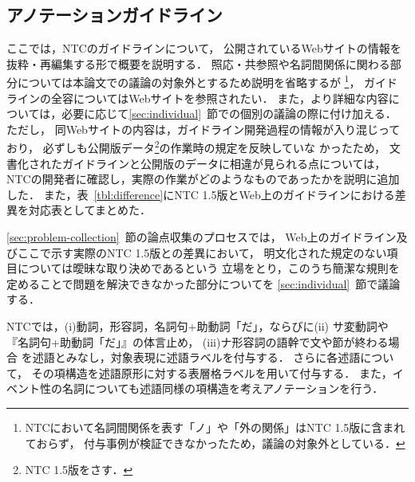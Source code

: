 \documentclass[japanese]{jnlp_1.4}
\begin{document}
\subsection{アノテーションガイドライン}
\label{sec:ntc-guideline}

ここでは，NTCのガイドラインについて，
公開されているWebサイト\cite{ntcguideline}の情報を抜粋・再編集する形で概要を説明する．
照応・共参照や名詞間関係に関わる部分については本論文での議論の対象外とするため説明を省略するが
\footnote{
NTCにおいて名詞間関係を表す「ノ」や「外の関係」はNTC 1.5版に含まれておらず，
付与事例が検証できなかったため，議論の対象外としている．}，
ガイドラインの全容についてはWebサイトを参照されたい．
また，より詳細な内容については，必要に応じて\ref{sec:individual}~節での個別の議論の際に付け加える．
ただし，
同Webサイトの内容は，ガイドライン開発過程の情報が入り混じっており，
必ずしも公開版データ\footnote{NTC 1.5版をさす．}の作業時の規定を反映していな
かったため，
文書化されたガイドラインと公開版のデータに相違が見られる点については，
NTCの開発者に確認し，実際の作業がどのようなものであったかを説明に追加した．
また，表~\ref{tbl:difference}にNTC 1.5版とWeb上のガイドラインにおける差異を対応表としてまとめた．

\begin{table}[b]
\caption{NTC 1.5版とWeb上のガイドラインにおける仕様の差異（共参照・照応・名詞間関係を除く）}
\label{tbl:difference}

\end{table}

\ref{sec:problem-collection}~節の論点収集のプロセスでは，
Web上のガイドライン及びここで示す実際のNTC 1.5版との差異において，
明文化された規定のない項目については曖昧な取り決めであるという
立場をとり，このうち簡潔な規則を定めることで問題を解決できなかった部分についてを
\ref{sec:individual}~節で議論する．

NTCでは，(i)動詞，形容詞，名詞句+助動詞「だ」，ならびに(ii)
サ変動詞や『名詞句+助動詞「だ」』の体言止め，
(iii)ナ形容詞の語幹で文や節が終わる場合
を述語とみなし，対象表現に述語ラベルを付与する．
さらに各述語について，
その項構造を述語原形に対する表層格ラベルを用いて付与する．
また，イベント性の名詞についても述語同様の項構造を考えアノテーションを行う．
\end{document}
